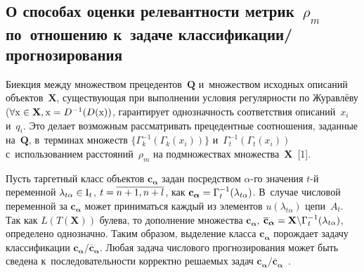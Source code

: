 \begin{multicols}{2}
\section{О способах оценки релевантности метрик~$\rho_m$ по~отношению к~задаче клас\-сификации/прогнозирования}

     Биекция между множеством прецедентов~$\mathbf{Q}$ и~множеством 
исходных описаний объектов~$\mathbf{X}$, существующая при выполнении 
условия регулярности по Журавлёву ($\forall \mathrm{x}\hm\in \mathbf{X}, 
\mathrm{x}\hm= D^{-1}(D(\mathrm{x}))$, гарантирует однозначность 
соответствия описаний~$x_i$ и~$q_i$. Это делает возможным рассматривать 
прецедентные соотношения, заданные на~$\mathbf{Q}$, в~терминах 
множеств $\{ \Gamma_k^{-1}(\Gamma_k(x_i))\}$ и~$\Gamma_t^{-1}( 
\Gamma_t(x_i))$ с~использованием расстояний~$\rho_m$ на подмножествах 
множества~$\mathbf{X}$~[1].
     
     Пусть таргетный класс объектов $\mathbf{c}_{\bm{\alpha}}$ задан 
посредством $\alpha$-го значения $t$-й переменной $\lambda_{t\alpha}\hm\in 
\mathrm{I}_t$, $t\hm= \overline{n+1,  n+l}$, как $\mathbf{c}_{{\bm 
\alpha}} \hm= \Gamma_t^{-1}(\lambda_{t\alpha})$. В~случае числовой 
переменной за $\mathbf{c}_{\bm{\alpha}}$ может приниматься каждый из 
элементов $u(\lambda_{t\alpha})$ цепи~$A_t$. Так как 
$L(T(\mathbf{X}))$ булева, то дополнение множества 
$\mathbf{c}_{\bm{\alpha}}$, $\overline{\mathbf{c}}_{\bm{\alpha}} \hm= 
\mathbf{X}\backslash \Gamma_t^{-1}(\lambda_{t\alpha})$, определено 
однозначно. Таким образом, выделение класса $\mathbf{c}_{\bm{\alpha}}$ 
порождает задачу классификации $\mathbf{c}_{\bm{\alpha}}/ 
\overline{\mathbf{c}}_{\bm{\alpha}}$. Любая задача числового 
прогнозирования может быть сведена к~последовательности корректно 
решаемых задач $\mathbf{c}_{\bm{\alpha}}/ 
\overline{\mathbf{c}}_{\bm{\alpha}}$~\cite{5-tor}.
     

\end{multicols}
